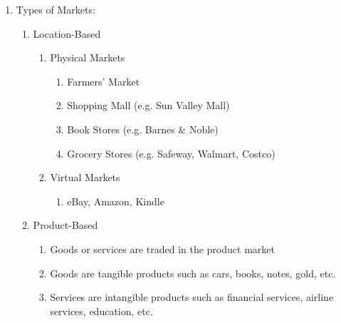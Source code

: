 \documentclass[12pt]{article}
\begin{document}
\begin{enumerate}
\begin{enumerate}
        \end{enumerate}

      \item Types of Markets:

        \begin{enumerate}

          \item Location-Based

            \begin{enumerate}

              \item Physical Markets

                \begin{enumerate}

                 \item Farmers' Market

                 \item Shopping Mall (e.g. Sun Valley Mall)

                 \item Book Stores (e.g. Barnes \& Noble)

                 \item Grocery Stores (e.g. Safeway, Walmart, Costco)

               \end{enumerate}

             \item Virtual Markets

               \begin{enumerate}

                 \item eBay, Amazon, Kindle

               \end{enumerate}

            \end{enumerate}

          \item Product-Based

            \begin{enumerate}

              \item Goods or services are traded in the product market

              \item Goods are tangible products such as cars, books, notes, gold, etc.

              \item Services are intangible products such as financial services, airline services, education, etc.


\end{enumerate}
\end{enumerate}
\end{enumerate}
\end{document}
